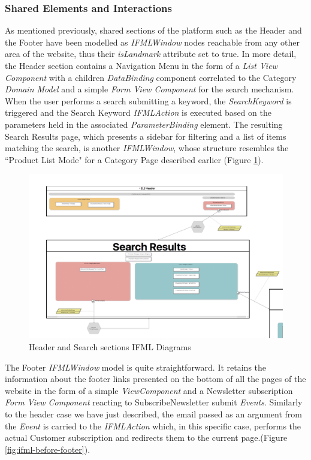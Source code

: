 \subsubsection{Shared Elements and Interactions}

As mentioned previously, shared sections of the platform such as the Header and the Footer have been modelled as \textit{IFMLWindow} nodes reachable from any other area of the website, thus their \textit{isLandmark} attribute set to true. In more detail, the Header section contains a Navigation Menu in the form of a \textit{List View Component} with a children \textit{DataBinding} component correlated to the Category \textit{Domain Model} and a simple \textit{Form View Component} for the search mechanism. When the user performs a search submitting a keyword, the \textit{SearchKeyword} is triggered and the Search Keyword \textit{IFMLAction} is executed based on the parameters held in the associated \textit{ParameterBinding} element.  The resulting Search Results page, which presents a sidebar for filtering and a list of items matching the search, is another \textit{IFMLWindow}, whose structure resembles the ``Product List Mode" for a Category Page described earlier (Figure \ref{fig:ifml-before-header-search}).

\vspace{0.5cm}
\begin{figure}[H]
  \centering
    \includegraphics[width=12cm]{images/diagrams/before/ifml-header-search.png}
  \caption{Header and Search sections IFML Diagrams}
  \label{fig:ifml-before-header-search}
\end{figure}
\vspace{0.5cm}

The Footer \textit{IFMLWindow} model is quite straightforward. It retains the information about the footer links presented on the bottom of all the pages of the website in the form of a simple \textit{ViewComponent} and a Newsletter subscription \textit{Form View Component} reacting to SubscribeNewsletter submit \textit{Events}. Similarly to the header case we have just described, the email passed as an argument from the \textit{Event} is carried to the \textit{IFMLAction} which, in this specific case, performs the actual Customer subscription and redirects them to the current page.(Figure \ref{fig:ifml-before-footer}).

